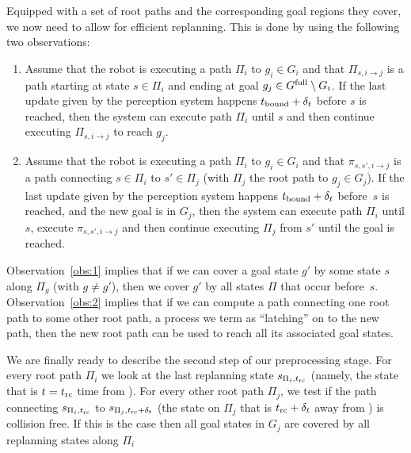 \documentclass[conference]{IEEEtran}
\begin{document}
Equipped with a set of root paths and the corresponding goal regions they cover, we now need to allow for efficient replanning. This is done by using the following two observations:
\begin{enumerate}[label={\textbf{O\arabic*}},leftmargin=0.75cm]
    \item \label{obs:1} 
    Assume that the robot is executing a path $\Pi_i$ to $g_i \in G_i$ and that $\Pi_{s, i \rightarrow j}$ is a path starting at state $s \in \Pi_i$ and ending at goal $g_j \in G^{\textrm{full}} \setminus G_i$.
    If the last update given by the perception system happens $t_{\textrm{bound}} + \delta_t$ before $s$ is reached,
    then the system can execute path $\Pi_i$ until $s$ and then continue executing $\Pi_{s, i \rightarrow j}$ to reach  $g_j$.

    \item \label{obs:2} 
    Assume that the robot is executing a path $\Pi_i$ to $g_i \in G_i$ and that $\pi_{s,s',i \rightarrow j}$ is a path connecting  $s \in \Pi_i$ to $s' \in \Pi_j$ (with $\Pi_j$ the root path to $g_j \in G_j$).
    If the last update given by the perception system happens $t_{\textrm{bound}} + \delta_t$ before~$s$ is reached,
    and the new goal is in $G_j$,
    then the system can execute path $\Pi_i$ until $s$, execute $\pi_{s,s',i \rightarrow j}$ and then continue executing $\Pi_{j}$ from $s'$ until the goal is reached.

\end{enumerate}

%
Observation~\ref{obs:1} implies that if we can cover a goal state $g'$  by some state $s$ along $\Pi_g$ (with $g \neq g'$), then we cover $g'$ by all states $\Pi$ that occur before~$s$.
%
Observation~\ref{obs:2} implies that if we can compute a path connecting one root path to some other root path, a process we term as ``latching'' on to the new path, then the new root path can be used to reach all its associated goal states.

We are finally ready to describe the second step of our preprocessing stage.
%
For every root path $\Pi_i$ we look at the last replanning state $s_{\Pi_i, t_{\textrm{rc}}}$ (namely, the state that is $t=t_{\textrm{rc}}$ time from \Shome). For every other root path $\Pi_j$, we test if the path connecting $s_{\Pi_i, t_{\textrm{rc}}}$ to $s_{\Pi_j, t_{\textrm{rc}} + \delta_t}$ (the state on $\Pi_j$ that is $t_{\textrm{rc}}+\delta_t$ away from \Shome) is collision free. 
%
If this is the case then all goal states in $G_j$ are covered by all replanning states along $\Pi_i$
%
\end{document}
